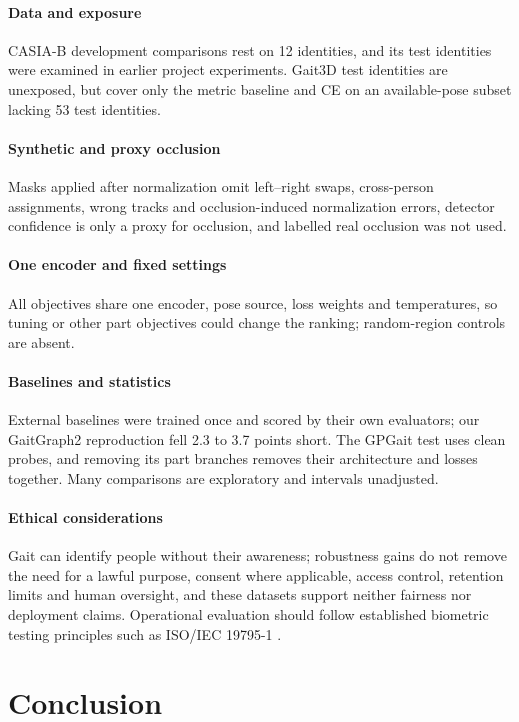 \documentclass[review,12pt]{elsarticle}
\begin{document}
\paragraph{Data and exposure}
CASIA-B development comparisons rest on 12 identities, and its test identities
were examined in earlier project experiments. Gait3D test identities are
unexposed, but cover only the metric baseline and CE on an available-pose
subset lacking 53 test identities.

\paragraph{Synthetic and proxy occlusion}
Masks applied after normalization omit left--right swaps, cross-person
assignments, wrong tracks and occlusion-induced normalization errors, detector
confidence is only a proxy for occlusion, and labelled real occlusion was not
used.

\paragraph{One encoder and fixed settings}
All objectives share one encoder, pose source, loss weights and temperatures,
so tuning or other part objectives could change the ranking; random-region
controls are absent.

\paragraph{Baselines and statistics}
External baselines were trained once and scored by their own evaluators; our
GaitGraph2 reproduction fell 2.3 to 3.7 points short. The GPGait test uses clean
probes, and removing its part branches removes their architecture and losses
together. Many comparisons are exploratory and intervals unadjusted.

\paragraph{Ethical considerations}
Gait can identify people without their awareness; robustness gains do not
remove the need for a lawful purpose, consent where applicable, access control,
retention limits and human oversight, and these datasets support neither
fairness nor deployment claims. Operational evaluation should follow
established biometric testing principles such as ISO/IEC 19795-1
\cite{iso19795}.

\section{Conclusion}
\label{sec:conclusion}
\end{document}
